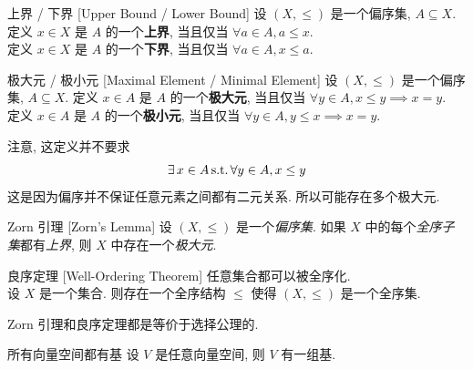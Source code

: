         \begin{dfn}
            {上界 / 下界}
            [Upper Bound / Lower Bound]
            设 \((X, \leq)\) 是一个偏序集, \(A\subseteq X\). 定义 \(x\in X\) 是 \(A\) 的一个\textbf{上界}, 当且仅当 \(\forall a\in A, a\leq x\). \\
            定义 \(x\in X\) 是 \(A\) 的一个\textbf{下界}, 当且仅当 \(\forall a\in A, x\leq a\).
        \end{dfn}

        \begin{dfn}
            {极大元 / 极小元}
            [Maximal Element / Minimal Element]
            设 \((X, \leq)\) 是一个偏序集, \(A\subseteq X\). 定义 \(x\in A\) 是 \(A\) 的一个\textbf{极大元}, 当且仅当 \(\forall y\in A, x\leq y\implies x=y\). \\
            定义 \(x\in A\) 是 \(A\) 的一个\textbf{极小元}, 当且仅当 \(\forall y\in A, y\leq x\implies x=y\).
        \end{dfn}

        \begin{rmk}
            [Dedicatia]
            注意, 这定义并不要求
            \[\exists\,x\in A\operatorname{\text{s.t.}} \forall y\in A, x\leq y\]
            这是因为偏序并不保证任意元素之间都有二元关系. 所以可能存在多个极大元.
        \end{rmk}

        \begin{thm}
            [zorn]
            {Zorn 引理}
            [Zorn's Lemma]
            设 \((X, \leq)\) 是一个\textit{偏序集}. 如果 \(X\) 中的每个\textit{全序子集}都有\textit{上界}, 则 \(X\) 中存在一个\textit{极大元}.
        \end{thm}

        \begin{thm}
            {良序定理}
            [Well-Ordering Theorem]
            任意集合都可以被全序化. \\
            设 \(X\) 是一个集合. 则存在一个全序结构 \(\leq\) 使得 \((X, \leq)\) 是一个全序集.
        \end{thm}

        \begin{rmk}
            [Dedicatia]
            Zorn 引理和良序定理都是等价于选择公理的. 
        \end{rmk}

        \begin{thm}
            {所有向量空间都有基}
            设 \(V\) 是任意向量空间, 则 \(V\) 有一组基.
        \end{thm}

